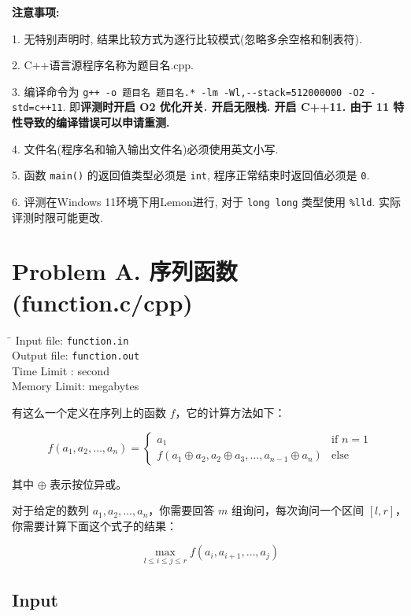 \documentclass[11pt,a4paper]{article}
\begin{document}
\begin{spacing}{1.25}
	\textbf{注意事项:} \par
	1. 无特别声明时, 结果比较方式为逐行比较模式(忽略多余空格和制表符).  \par
	2. C++语言源程序名称为题目名.cpp.  \par
	3. 编译命令为 \verb|g++ -o 题目名 题目名.* -lm -Wl,--stack=512000000 -O2 -std=c++11|. 即\textbf{评测时开启 O2 优化开关. 开启无限栈. 开启 C++11. 由于 11 特性导致的编译错误可以申请重测.} \par
	4. 文件名(程序名和输入输出文件名)必须使用英文小写.  \par
	5. 函数 \verb|main()| 的返回值类型必须是 \verb|int|, 程序正常结束时返回值必须是 \verb|0|.  \par
	6. 评测在Windows 11环境下用Lemon进行, 对于 \verb|long long| 类型使用 \verb|%lld|. 实际评测时限可能更改.  \par
	\thispagestyle{empty}
	\newpage
	\section{Problem A. 序列函数(function.c/cpp)} 
		\begin{tabbing}
			\hspace{4cm} \= \kill
			\indent  Input file: \> \texttt{function.in} \\
			\indent  Output file: \> \texttt{function.out} \\
			\indent  Time Limit :  second \\
			\indent  Memory Limit:  megabytes 
		\end{tabbing}

		有这么一个定义在序列上的函数 $f$，它的计算方法如下：

		$$f(a_1,a_2,\ldots,a_n)=\begin{cases}a_1&\text{if $n=1$}\\f(a_1\oplus a_2,a_2\oplus a_3,\ldots,a_{n-1}\oplus a_n)&\text{else}\end{cases}$$

		其中 $\oplus$ 表示按位异或。

		对于给定的数列 $a_1,a_2,\ldots,a_n$，你需要回答 $m$ 组询问，每次询问一个区间 $[l,r]$，你需要计算下面这个式子的结果：

		$$\max_{l\leqslant i\leqslant j\leqslant r} f(a_i,a_{i+1},\ldots,a_j)$$

		\subsection{Input}


\end{spacing}
\end{document}
